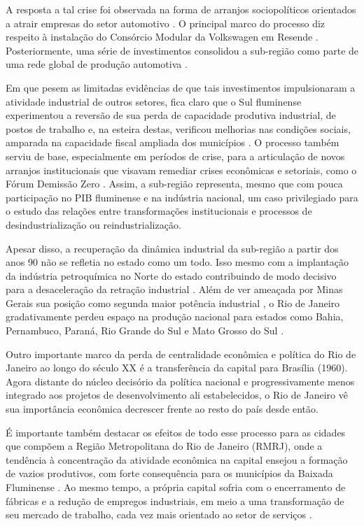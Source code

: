 A resposta a tal crise foi observada na forma de arranjos sociopolíticos
orientados a atrair empresas do setor automotivo
\citep{ramalho2015,santos_o_2007}. O principal marco do processo diz respeito à instalação
do Consórcio Modular da Volkswagen em Resende
\citep{abreubeynonramalho2000}. Posteriormente, uma série de investimentos consolidou a
sub-região como parte de uma rede global de produção automotiva
\citep{santos2021}.

Em que pesem as limitadas evidências de que tais investimentos
impulsionaram a atividade industrial de outros setores, fica claro que o
Sul fluminense experimentou a reversão de sua perda de capacidade
produtiva industrial, de postos de trabalho e, na esteira destas,
verificou melhorias nas condições sociais, amparada na capacidade fiscal
ampliada dos municípios
\citep{ramalho2015}. O
processo também serviu de base, especialmente em períodos de crise, para
a articulação de novos arranjos institucionais que visavam remediar
crises econômicas e setoriais, como o Fórum Demissão Zero
\citep{ramalho2005}.
Assim, a sub-região representa, mesmo que com pouca participação no PIB
fluminense e na indústria nacional, um caso privilegiado para o estudo
das relações entre transformações institucionais e processos de
desindustrialização ou reindustrialização.

Apesar disso, a recuperação da dinâmica industrial da sub-região a
partir dos anos 90 não se refletia no estado como um todo. Isso mesmo
com a implantação da indústria petroquímica no Norte do estado
contribuindo de modo decisivo para a desaceleração da retração
industrial \citep{piquet2021}. Além de ver ameaçada por Minas Gerais sua posição como segunda
maior potência industrial
\citep{cni2021}, o Rio de
Janeiro gradativamente perdeu espaço na produção nacional para estados
como Bahia, Pernambuco, Paraná, Rio Grande do Sul e Mato Grosso do Sul
\citep{cni2021}.

Outro importante marco da perda de centralidade econômica e política do
Rio de Janeiro ao longo do século XX é a transferência da capital para
Brasília (1960). Agora distante do núcleo decisório da política nacional
e progressivamente menos integrado aos projetos de desenvolvimento ali
estabelecidos, o Rio de Janeiro vê sua importância econômica decrescer
frente ao resto do país desde então.

É importante também destacar os efeitos de todo esse processo para as
cidades que compõem a Região Metropolitana do Rio de Janeiro (RMRJ),
onde a tendência à concentração da atividade econômica na capital
ensejou a formação de vazios produtivos, com forte consequência para os
municípios da Baixada Fluminense
\citep{sobral2016,sobral2017}.
Ao mesmo tempo, a própria capital sofria com o encerramento de fábricas
e a redução de empregos industriais, em meio a uma transformação de seu
mercado de trabalho, cada vez mais orientado ao setor de serviços .

